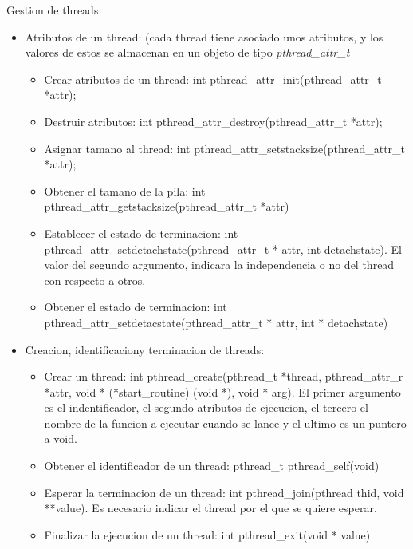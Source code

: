 \documentclass[12pt, letterpaper]{article}
\begin{document}
Gestion de threads:

\begin{itemize}
	\item Atributos de un thread: (cada thread tiene asociado unos atributos, y los valores de estos se almacenan en un objeto de tipo \textit{pthread\_attr\_t}
		\begin{itemize}
			\item Crear atributos de un thread: int pthread\_attr\_init(pthread\_attr\_t *attr);
			\item Destruir atributos: int pthread\_attr\_destroy(pthread\_attr\_t *attr);
			\item Asignar tamano al thread: int pthread\_attr\_setstacksize(pthread\_attr\_t *attr);
			\item Obtener el tamano de la pila: int pthread\_attr\_getstacksize(pthread\_attr\_t *attr)
			\item Establecer el estado de terminacion: int pthread\_attr\_setdetachstate(pthread\_attr\_t * attr, int detachstate). El valor del segundo argumento, indicara la independencia o no del thread con respecto a otros.
			\item Obtener el estado de terminacion: int pthread\_attr\_setdetacstate(pthread\_attr\_t * attr, int * detachstate)
		\end{itemize}
	\item Creacion, identificaciony terminacion de threads:
		\begin{itemize}
			\item Crear un thread: int pthread\_create(pthread\_t *thread, pthread\_attr\_r *attr, void * (*start\_routine) (void *), void * arg). El primer argumento es el indentificador, el segundo atributos de ejecucion, el tercero el nombre de la funcion a ejecutar cuando se lance y el ultimo es un puntero a void.
			\item Obtener el identificador de un thread: pthread\_t pthread\_self(void)
			\item Esperar la terminacion de un thread: int pthread\_join(pthread thid, void **value). Es necesario indicar el thread por el que se quiere esperar.
			\item Finalizar la ejecucion de un thread: int pthread\_exit(void * value)
		\end{itemize}
\end{itemize}
\end{document}

